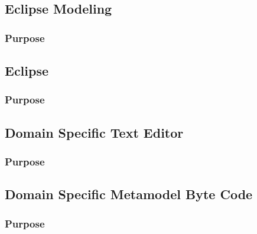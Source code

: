 \documentclass{gemoc} %
\begin{document}


\subsection{Eclipse Modeling}


\subsubsection{Purpose}



\subsection{Eclipse}


\subsubsection{Purpose}



\subsection{Domain Specific Text Editor}


\subsubsection{Purpose}



\subsection{Domain Specific Metamodel Byte Code}


\subsubsection{Purpose}
\end{document}
